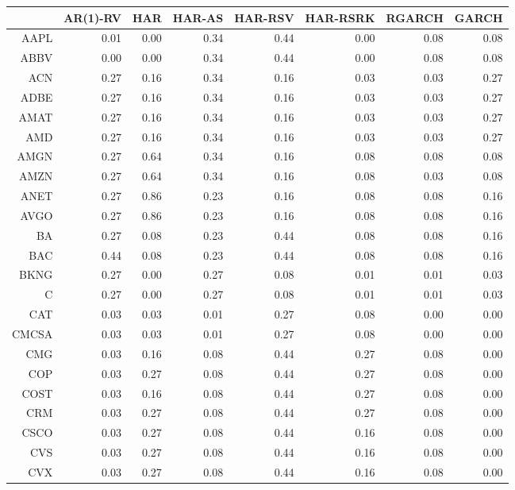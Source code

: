 \begin{table}[ht]
\centering
\begin{tabular}{rrrrrrrr}
  \hline
 & AR(1)-RV & HAR & HAR-AS & HAR-RSV & HAR-RSRK & RGARCH & GARCH \\ 
  \hline
AAPL & 0.01 & 0.00 & 0.34 & 0.44 & 0.00 & 0.08 & 0.08 \\ 
  ABBV & 0.00 & 0.00 & 0.34 & 0.44 & 0.00 & 0.08 & 0.08 \\ 
  ACN & 0.27 & 0.16 & 0.34 & 0.16 & 0.03 & 0.03 & 0.27 \\ 
  ADBE & 0.27 & 0.16 & 0.34 & 0.16 & 0.03 & 0.03 & 0.27 \\ 
  AMAT & 0.27 & 0.16 & 0.34 & 0.16 & 0.03 & 0.03 & 0.27 \\ 
  AMD & 0.27 & 0.16 & 0.34 & 0.16 & 0.03 & 0.03 & 0.27 \\ 
  AMGN & 0.27 & 0.64 & 0.34 & 0.16 & 0.08 & 0.08 & 0.08 \\ 
  AMZN & 0.27 & 0.64 & 0.34 & 0.16 & 0.08 & 0.03 & 0.08 \\ 
  ANET & 0.27 & 0.86 & 0.23 & 0.16 & 0.08 & 0.08 & 0.16 \\ 
  AVGO & 0.27 & 0.86 & 0.23 & 0.16 & 0.08 & 0.08 & 0.16 \\ 
  BA & 0.27 & 0.08 & 0.23 & 0.44 & 0.08 & 0.08 & 0.16 \\ 
  BAC & 0.44 & 0.08 & 0.23 & 0.44 & 0.08 & 0.08 & 0.16 \\ 
  BKNG & 0.27 & 0.00 & 0.27 & 0.08 & 0.01 & 0.01 & 0.03 \\ 
  C & 0.27 & 0.00 & 0.27 & 0.08 & 0.01 & 0.01 & 0.03 \\ 
  CAT & 0.03 & 0.03 & 0.01 & 0.27 & 0.08 & 0.00 & 0.00 \\ 
  CMCSA & 0.03 & 0.03 & 0.01 & 0.27 & 0.08 & 0.00 & 0.00 \\ 
  CMG & 0.03 & 0.16 & 0.08 & 0.44 & 0.27 & 0.08 & 0.00 \\ 
  COP & 0.03 & 0.27 & 0.08 & 0.44 & 0.27 & 0.08 & 0.00 \\ 
  COST & 0.03 & 0.16 & 0.08 & 0.44 & 0.27 & 0.08 & 0.00 \\ 
  CRM & 0.03 & 0.27 & 0.08 & 0.44 & 0.27 & 0.08 & 0.00 \\ 
  CSCO & 0.03 & 0.27 & 0.08 & 0.44 & 0.16 & 0.08 & 0.00 \\ 
  CVS & 0.03 & 0.27 & 0.08 & 0.44 & 0.16 & 0.08 & 0.00 \\ 
  CVX & 0.03 & 0.27 & 0.08 & 0.44 & 0.16 & 0.08 & 0.00 \\ 

\end{tabular}
\end{table}
